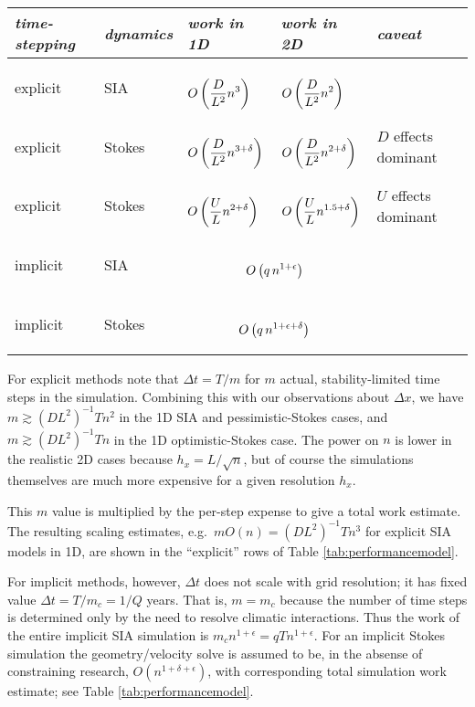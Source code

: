 \documentclass[twocolumn,letterpaper]{igs}
\newcommand\eps{\epsilon}
\begin{document}
\newcommand{\oo}[1]{{\LARGE \strut} \displaystyle O\left(#1\right)}
\setlength{\tabcolsep}{5pt}
\renewcommand{\arraystretch}{1.5}
\begin{table*}[ht]
\begin{center}
\begin{tabular}{lllll}
\emph{time-stepping} & \emph{dynamics} & \emph{work in 1D} & \emph{work in 2D} & \emph{caveat} \\ \hline
explicit & SIA    & $\oo{\frac{D}{L^2} n^3}$       & $\oo{\frac{D}{L^2} n^2}$ \\
explicit & Stokes & $\oo{\frac{D}{L^2} n^{3+\delta}}$ & $\oo{\frac{D}{L^2} n^{2+\delta}}$ &  $D$ effects dominant \\
explicit & Stokes & $\oo{\frac{U}{L} n^{2+\delta}}$    & $\oo{\frac{U}{L} n^{1.5+\delta}}$  & $U$ effects dominant \\
implicit & SIA    & \multicolumn{2}{c}{$\oo{q\, n^{1+\eps}}$} \\
implicit & Stokes & \multicolumn{2}{c}{$\oo{q\, n^{1+\eps+\delta}}$}
\end{tabular}
\end{center}

\medskip
\caption{Asymptotic scaling of computational work, in flops per model year, for time-stepping numerical ice sheet simulations over domain width $L$, as the degrees of freedom $n$ go to infinity (high horizontal resolution).  See Table \ref{tab:notation} for remaining notation; \emph{1D} and \emph{2D} refer to flow-line and map-plane simulations, respectively.}
\label{tab:performancemodel}
\end{table*}

For explicit methods note that $\Delta t = T/m$ for $m$ actual, stability-limited time steps in the simulation.  Combining this with our observations about $\Delta x$, we have $m \gtrsim (DL^2)^{-1} T n^2$ in the 1D SIA and pessimistic-Stokes cases, and $m \gtrsim (DL^2)^{-1} T n$ in the 1D optimistic-Stokes case.  The power on $n$ is lower in the realistic 2D cases because $h_x = L/\sqrt{n}$, but of course the simulations themselves are much more expensive for a given resolution $h_x$.

This $m$ value is multiplied by the per-step expense to give a total work estimate.  The resulting scaling estimates, e.g.~$m O(n) = (DL^2)^{-1} T n^3$ for explicit SIA models in 1D, are shown in the ``explicit'' rows of Table \ref{tab:performancemodel}.

For implicit methods, however, $\Delta t$ does not scale with grid resolution; it has fixed value $\Delta t = T / m_c = 1/Q$ years.  That is, $m=m_c$ because the number of time steps is determined only by the need to resolve climatic interactions.  Thus the work of the entire implicit SIA simulation is $m_c n^{1+\eps} = q T n^{1+\eps}$.  For an implicit Stokes simulation the geometry/velocity solve is assumed to be, in the absense of constraining research, $O(n^{1+\delta+\eps})$, with corresponding total simulation work estimate; see Table \ref{tab:performancemodel}.
\end{document}
